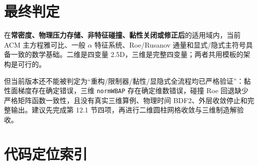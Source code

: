 \documentclass[UTF8,11pt,a4paper]{ctexart}
\newcommand{\code}[1]{\nolinkurl{#1}}
\begin{document}
\section{最终判定}

在\textbf{常密度、物理压力存储、非特征碰撞、黏性关闭或修正后}的适用域内，当前 ACM 主方程雅可比、一般 $\alpha$ 特征系统、Roe/Rusanov 通量和显式/隐式主符号具备一致的数学基础。二维是四变量 2.5D，三维是完整四变量；两者共用模板的架构是可行的。

但当前版本还不能被判定为“重构/限制器/黏性/显隐式全流程均已严格验证”：黏性面梯度存在确定错误，三维 \code{normWBAP} 存在确定维数错误，碰撞 Roe 回退缺少严格矩阵函数一致性，且没有真实三维算例、物理时间 BDF2、外层收敛停止和完整输出。建议先完成第 12.1 节四项，再进行二维圆柱网格收敛与三维制造解验收。

\appendix
\section{代码定位索引}
\end{document}

